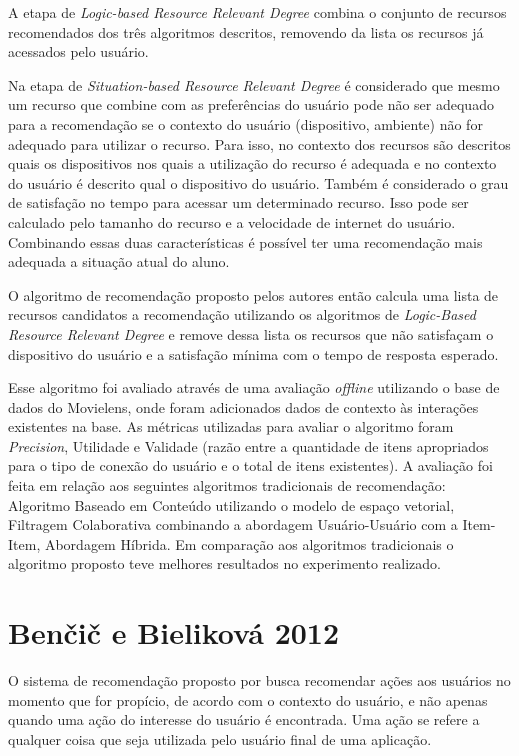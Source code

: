 A etapa de \textit{Logic-based Resource Relevant Degree} combina o conjunto de recursos recomendados dos três algoritmos
descritos, removendo da lista os recursos já acessados pelo usuário.

Na etapa de \textit{Situation-based Resource Relevant Degree} é considerado que mesmo um recurso que combine com as preferências
do usuário pode não ser adequado para a recomendação se o contexto do usuário (dispositivo, ambiente) não for adequado
para utilizar o recurso. Para isso, no contexto dos recursos são descritos quais os dispositivos nos quais a utilização do
recurso é adequada e no contexto do usuário é descrito qual o dispositivo do usuário. Também é considerado o grau de
satisfação no tempo para acessar um determinado recurso. Isso pode ser calculado pelo tamanho do recurso e a velocidade
de internet do usuário. Combinando essas duas características é possível ter uma recomendação mais adequada a situação
atual do aluno.

O algoritmo de recomendação proposto pelos autores então calcula uma lista de recursos candidatos a recomendação
utilizando os algoritmos de \textit{Logic-Based Resource Relevant Degree} e remove dessa lista os recursos que não satisfaçam o
dispositivo do usuário e a satisfação mínima com o tempo de resposta esperado.

Esse algoritmo foi avaliado através de uma avaliação \textit{offline} utilizando o base de dados do Movielens, onde foram adicionados dados de
contexto às interações existentes na base. As métricas utilizadas para avaliar o algoritmo foram \textit{Precision}, Utilidade e
Validade (razão entre a quantidade de itens apropriados para o tipo de conexão do usuário e o total de itens existentes).
A avaliação foi feita em relação aos seguintes  algoritmos tradicionais de recomendação: Algoritmo Baseado em Conteúdo
utilizando o modelo de espaço vetorial, Filtragem Colaborativa combinando a abordagem Usuário-Usuário com a Item-Item, Abordagem
Híbrida. Em comparação aos algoritmos tradicionais o algoritmo proposto teve melhores resultados no
experimento realizado.

\section{Benčič e Bieliková 2012}

O sistema de recomendação proposto por  busca recomendar ações aos usuários no momento que
for propício, de acordo com o contexto do usuário, e não apenas quando uma ação do interesse do usuário é encontrada.
Uma ação se refere a qualquer coisa que seja utilizada pelo usuário final de uma aplicação.

